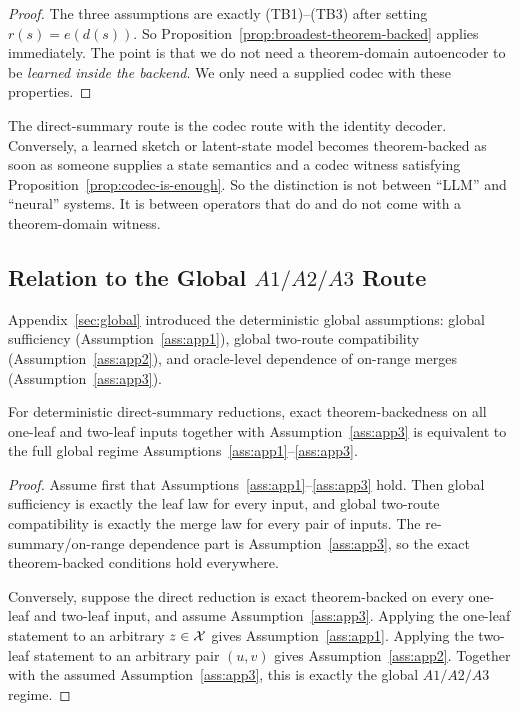 \begin{proof}
The three assumptions are exactly \textup{(TB1)}--\textup{(TB3)} after setting
$r(s)=e(d(s))$. So Proposition~\ref{prop:broadest-theorem-backed} applies
immediately. The point is that we do not need a theorem-domain autoencoder to
be \emph{learned inside the backend}. We only need a supplied codec with these
properties.
\end{proof}

\begin{remark}
The direct-summary route is the codec route with the identity decoder.
Conversely, a learned sketch or latent-state model becomes theorem-backed as
soon as someone supplies a state semantics and a codec witness satisfying
Proposition~\ref{prop:codec-is-enough}. So the distinction is not between
``LLM'' and ``neural'' systems. It is between operators that do and do not come
with a theorem-domain witness.
\end{remark}

\subsection{Relation to the Global $A1/A2/A3$ Route}

Appendix~\ref{sec:global} introduced the deterministic global assumptions:
global sufficiency (Assumption~\ref{ass:app1}), global two-route compatibility
(Assumption~\ref{ass:app2}), and oracle-level dependence of on-range merges
(Assumption~\ref{ass:app3}).

\begin{proposition}
\label{prop:all-input-collapse}
For deterministic direct-summary reductions, exact theorem-backedness on all
one-leaf and two-leaf inputs together with Assumption~\ref{ass:app3} is
equivalent to the full global regime
\textup{Assumptions~\ref{ass:app1}--\ref{ass:app3}}.
\end{proposition}

\begin{proof}
Assume first that Assumptions~\ref{ass:app1}--\ref{ass:app3} hold. Then global
sufficiency is exactly the leaf law for every input, and global two-route
compatibility is exactly the merge law for every pair of inputs. The
re-summary/on-range dependence part is Assumption~\ref{ass:app3}, so the exact
theorem-backed conditions hold everywhere.

Conversely, suppose the direct reduction is exact theorem-backed on every
one-leaf and two-leaf input, and assume Assumption~\ref{ass:app3}. Applying the
one-leaf statement to an arbitrary $z\in\mathcal{X}$ gives
Assumption~\ref{ass:app1}. Applying the two-leaf statement to an arbitrary pair
$(u,v)$ gives Assumption~\ref{ass:app2}. Together with the assumed
Assumption~\ref{ass:app3}, this is exactly the global $A1/A2/A3$ regime.
\end{proof}

